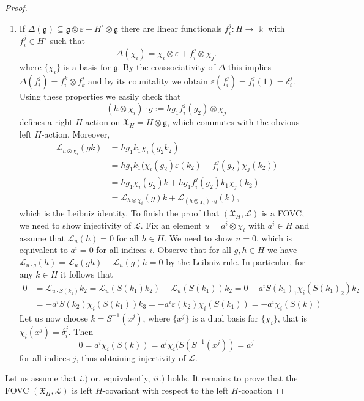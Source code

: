 \documentclass{article}
\theoremstyle{definition}
\newcommand{\fg}{{\mathfrak{g}}}
\begin{document}
\begin{proof}
\begin{enumerate}
			\item[ii.) $\Rightarrow$ i.)] If $\Delta(\mathfrak{g})\subseteq \mathfrak{g}\otimes\varepsilon+
			H^\circ\otimes\mathfrak{g}$ there are linear functionals $f_i^j\colon H\to\Bbbk$ with $f_i^j\in H^\circ$ such that
			$$
			\Delta(\chi_i)=\chi_i\otimes\varepsilon+f_i^j\otimes\chi_j.
			$$
			where  $\{\chi_i\}$ is a basis for $\fg$.
			By the coassociativity of $\Delta$ this implies $\Delta(f_i^j)=f_i^k\otimes f_k^j$ and by its counitality we obtain $\varepsilon(f_i^j)=f_i^j(1)=\delta_i^j$. 
			Using these properties we easily check that
			$$
			(h\otimes\chi_i)\cdot g:=hg_1f_i^j(g_2)\otimes\chi_j
			$$
			defines a right $H$-action on $\mathfrak{X}_H=H\otimes\mathfrak{g}$, which commutes with the obvious left $H$-action.
			Moreover,
			\begin{align*}
				\mathscr{L}_{h\otimes\chi_i}(gk)
				&=hg_1k_1\chi_i(g_2k_2)\\
				&=hg_1k_1\big(\chi_i(g_2)\varepsilon(k_2)+f_i^j(g_2)\chi_j(k_2)\big)\\
				&=hg_1\chi_i(g_2)k+hg_1f_i^j(g_2)k_1\chi_j(k_2)\\
				&=\mathscr{L}_{h\otimes\chi_i}(g)k
				+\mathscr{L}_{(h\otimes\chi_i)\cdot g}(k),
			\end{align*}
			which is the Leibniz identity. To finish the proof that
			$(\mathfrak{X}_H,\mathscr{L})$ is a FOVC, we need to show injectivity of $\mathscr{L}$. 
			Fix  an element $u=a^i \otimes \chi_i$ with $a^i\in H$ and
			assume that $\mathscr{L}_u(h)=0$ for all $h \in H$.
			We need to show $u=0$, which is equivalent to $a^i=0$ for all indices $i$. Observe that for all $g,h\in H$ we have $\mathscr{L}_{u\cdot g}(h)=\mathscr{L}_u(gh)-\mathscr{L}_u(g)h=0$ by the Leibniz rule. In particular, for any $k\in H$ it follows that
			\begin{align*}
				0
				&=\mathscr{L}_{u\cdot S(k_1)} k_2
				=\mathscr{L}_{u}(S(k_1)k_2)
				-\mathscr{L}_{u}(S(k_1))k_2
				=0-a^i S(k_1)_1\chi_i(S(k_1)_2) k_2\\
				&=-a^iS(k_2)\chi_i(S(k_1))k_3=-a^i\varepsilon(k_2)\chi_i(S(k_1))
				=-a^i\chi_i(S(k))
			\end{align*}
			Let us now choose $k=S^{-1}(x^j)$, where $\{x^j\}$ is a dual basis for $\{\chi_i\}$, that
			is $\chi_i(x^j)=\delta_i^j$. Then
			$$
			0=a^i\chi_i(S(k))=a^i\chi_i(S(S^{-1}(x^j))=a^j
			$$
			for all indices $j$, thus obtaining injectivity of $\mathscr{L}$.
		\end{enumerate}
		Let us assume that $i.)$ or, equivalently, $ii.)$ holds. It remains to prove that the FOVC $(\mathfrak{X}_H,\mathscr{L})$ is left $H$-covariant with respect to the left $H$-coaction 

\end{proof}
\end{document}
